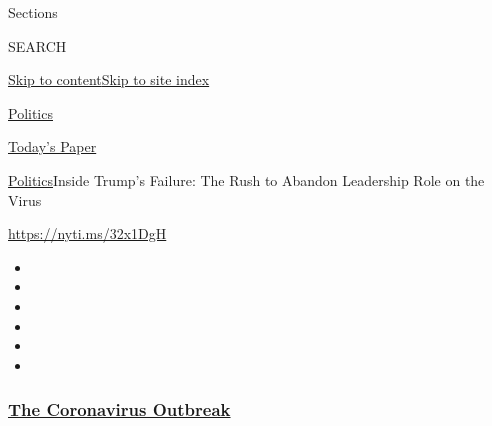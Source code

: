 Sections

SEARCH

\protect\hyperlink{site-content}{Skip to
content}\protect\hyperlink{site-index}{Skip to site index}

\href{https://www.nytimes3xbfgragh.onion/section/politics}{Politics}

\href{https://myaccount.nytimes3xbfgragh.onion/auth/login?response_type=cookie\&client_id=vi}{}

\href{https://www.nytimes3xbfgragh.onion/section/todayspaper}{Today's
Paper}

\href{/section/politics}{Politics}\textbar{}Inside Trump's Failure: The
Rush to Abandon Leadership Role on the Virus

\url{https://nyti.ms/32x1DgH}

\begin{itemize}
\item
\item
\item
\item
\item
\item
\end{itemize}

\hypertarget{the-coronavirus-outbreak}{%
\subsubsection{\texorpdfstring{\href{https://www.nytimes3xbfgragh.onion/news-event/coronavirus?name=styln-coronavirus-national\&region=TOP_BANNER\&block=storyline_menu_recirc\&action=click\&pgtype=Article\&impression_id=9509a2b0-f27a-11ea-846f-7542dfffcf40\&variant=undefined}{The
Coronavirus
Outbreak}}{The Coronavirus Outbreak}}\label{the-coronavirus-outbreak}}

